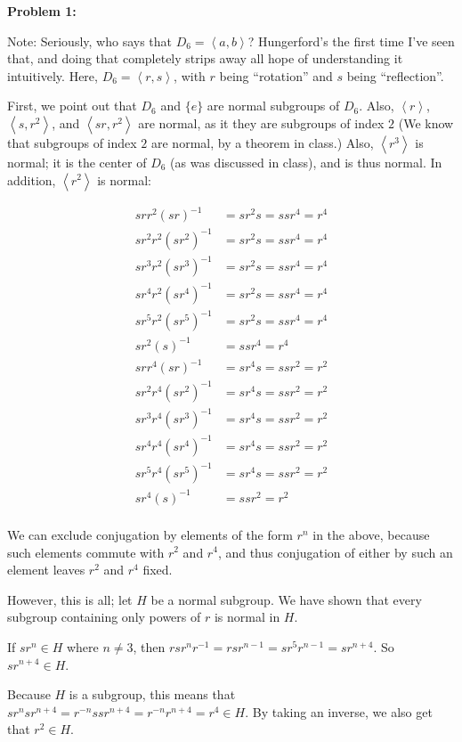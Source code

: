 \documentclass[a4paper,12pt]{article}
\newcommand{\anbrack}[1]{\left\langle #1 \right\rangle}
\begin{document}
{\bf Problem 1:}

Note: Seriously, who says that $D_6 = \anbrack{a,b}$? Hungerford's the first time I've seen that, and doing that completely strips away all hope of understanding it intuitively. Here, $D_6 = \anbrack{r,s}$, with $r$ being ``rotation'' and $s$ being ``reflection''.

First, we point out that $D_6$ and $\{e\}$ are normal subgroups of $D_6$. Also, $\anbrack{r}$, $\anbrack{s,r^2}$, and $\anbrack{sr,r^2}$ are normal, as it they are subgroups of index $2$ (We know that subgroups of index $2$ are normal, by a theorem in class.) Also, $\anbrack{r^3}$ is normal; it is the center of $D_6$ (as was discussed in class), and is thus normal. In addition, $\anbrack{r^2}$ is normal:

\begin{align*}
srr^2(sr)^{-1} &= sr^2s=ssr^4=r^4 \\
sr^2r^2(sr^2)^{-1} &= sr^2s=ssr^4=r^4 \\
sr^3r^2(sr^3)^{-1} &= sr^2s=ssr^4=r^4 \\
sr^4r^2(sr^4)^{-1} &= sr^2s=ssr^4=r^4 \\
sr^5r^2(sr^5)^{-1} &= sr^2s=ssr^4=r^4 \\
sr^2(s)^{-1} &=ssr^4=r^4 \\
srr^4(sr)^{-1} &= sr^4s=ssr^2=r^2 \\
sr^2r^4(sr^2)^{-1} &= sr^4s=ssr^2=r^2 \\
sr^3r^4(sr^3)^{-1} &= sr^4s=ssr^2=r^2 \\
sr^4r^4(sr^4)^{-1} &= sr^4s=ssr^2=r^2 \\
sr^5r^4(sr^5)^{-1} &= sr^4s=ssr^2=r^2 \\
sr^4(s)^{-1} &=ssr^2=r^2 \\
\end{align*}

We can exclude conjugation by elements of the form $r^n$ in the above, because such elements commute with $r^2$ and $r^4$, and thus conjugation of either by such an element leaves $r^2$ and $r^4$ fixed.

However, this is all; let $H$ be a normal subgroup. We have shown that every subgroup containing only powers of $r$ is normal in $H$. 

If $sr^n \in H$ where $n \neq 3$, then $rsr^nr^{-1} = rsr^{n-1}=sr^5r^{n-1}=sr^{n+4}$. So $sr^{n+4} \in H$.

Because $H$ is a subgroup, this means that $sr^nsr^{n+4} = r^{-n}ssr^{n+4}=r^{-n}r^{n+4}=r^4 \in H$. By taking an inverse, we also get that $r^2 \in H$.
\end{document}
